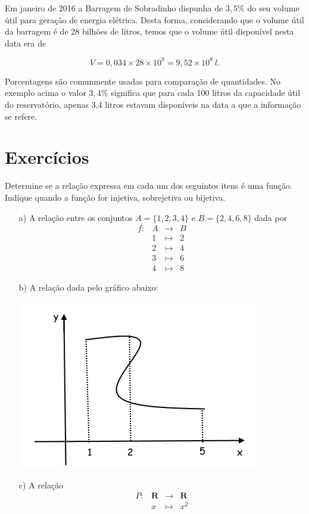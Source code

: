 \begin{ex} Em janeiro de 2016 a Barragem de Sobradinho dispunha de $3,5\%$ do seu volume útil para geração de energia elétrica.
Desta forma, considerando que o volume útil da barragem é de 28 bilhões de litros, temos que o volume útil disponível nesta data era de

$$V=0,034\times28\times10^9=9,52\times10^8 \ l.$$
\end{ex}

Porcentagens são comunmente usadas para comparação de quantidades.  No exemplo acima o valor $3,4\%$ significa que
para cada 100 litros da capacidade útil do reservatório, apenas 3,4 litros estavam disponíveis na data a que a informação se refere.

\section{Exercícios}


 Determine se a relação expressa em cada um dos seguintes itens é uma função. Indique quando a função for injetiva, sobrejetiva ou bijetiva.

\begin{itemize}
\item[a)] A relação entre os conjuntos $A=\{1,2,3,4\}$ e $B=\{2,4,6,8\}$ dada por
$$\begin{array}{crcl}
f:&A&\rightarrow&B\\
&1&\mapsto&2\\
&2&\mapsto&4\\
&3&\mapsto&6\\
&4&\mapsto&8
\end{array}$$

\item[b)] A relação dada pelo gráfico abaixo:

\begin{center}
\includegraphics[scale=0.8]{./chapters/preliminares/imgs/naofuncao}
\end{center}

\item[c)] A relação
$$\begin{array}{crcl}
P:&\mathbf{R}&\rightarrow& \mathbf{R} \\
&x&\mapsto& x^2\end{array}$$
\end{itemize}


